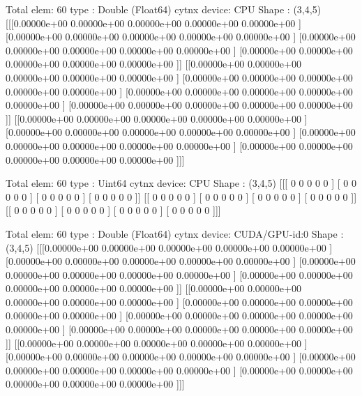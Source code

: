 \begin{DoxyVerbInclude}

Total elem: 60
type  : Double (Float64)
cytnx device: CPU
Shape : (3,4,5)
[[[0.00000e+00 0.00000e+00 0.00000e+00 0.00000e+00 0.00000e+00 ]
  [0.00000e+00 0.00000e+00 0.00000e+00 0.00000e+00 0.00000e+00 ]
  [0.00000e+00 0.00000e+00 0.00000e+00 0.00000e+00 0.00000e+00 ]
  [0.00000e+00 0.00000e+00 0.00000e+00 0.00000e+00 0.00000e+00 ]]
 [[0.00000e+00 0.00000e+00 0.00000e+00 0.00000e+00 0.00000e+00 ]
  [0.00000e+00 0.00000e+00 0.00000e+00 0.00000e+00 0.00000e+00 ]
  [0.00000e+00 0.00000e+00 0.00000e+00 0.00000e+00 0.00000e+00 ]
  [0.00000e+00 0.00000e+00 0.00000e+00 0.00000e+00 0.00000e+00 ]]
 [[0.00000e+00 0.00000e+00 0.00000e+00 0.00000e+00 0.00000e+00 ]
  [0.00000e+00 0.00000e+00 0.00000e+00 0.00000e+00 0.00000e+00 ]
  [0.00000e+00 0.00000e+00 0.00000e+00 0.00000e+00 0.00000e+00 ]
  [0.00000e+00 0.00000e+00 0.00000e+00 0.00000e+00 0.00000e+00 ]]]



Total elem: 60
type  : Uint64
cytnx device: CPU
Shape : (3,4,5)
[[[                  0                   0                   0                   0                   0 ]
  [                  0                   0                   0                   0                   0 ]
  [                  0                   0                   0                   0                   0 ]
  [                  0                   0                   0                   0                   0 ]]
 [[                  0                   0                   0                   0                   0 ]
  [                  0                   0                   0                   0                   0 ]
  [                  0                   0                   0                   0                   0 ]
  [                  0                   0                   0                   0                   0 ]]
 [[                  0                   0                   0                   0                   0 ]
  [                  0                   0                   0                   0                   0 ]
  [                  0                   0                   0                   0                   0 ]
  [                  0                   0                   0                   0                   0 ]]]



Total elem: 60
type  : Double (Float64)
cytnx device: CUDA/GPU-id:0
Shape : (3,4,5)
[[[0.00000e+00 0.00000e+00 0.00000e+00 0.00000e+00 0.00000e+00 ]
  [0.00000e+00 0.00000e+00 0.00000e+00 0.00000e+00 0.00000e+00 ]
  [0.00000e+00 0.00000e+00 0.00000e+00 0.00000e+00 0.00000e+00 ]
  [0.00000e+00 0.00000e+00 0.00000e+00 0.00000e+00 0.00000e+00 ]]
 [[0.00000e+00 0.00000e+00 0.00000e+00 0.00000e+00 0.00000e+00 ]
  [0.00000e+00 0.00000e+00 0.00000e+00 0.00000e+00 0.00000e+00 ]
  [0.00000e+00 0.00000e+00 0.00000e+00 0.00000e+00 0.00000e+00 ]
  [0.00000e+00 0.00000e+00 0.00000e+00 0.00000e+00 0.00000e+00 ]]
 [[0.00000e+00 0.00000e+00 0.00000e+00 0.00000e+00 0.00000e+00 ]
  [0.00000e+00 0.00000e+00 0.00000e+00 0.00000e+00 0.00000e+00 ]
  [0.00000e+00 0.00000e+00 0.00000e+00 0.00000e+00 0.00000e+00 ]
  [0.00000e+00 0.00000e+00 0.00000e+00 0.00000e+00 0.00000e+00 ]]]



\end{DoxyVerbInclude}
